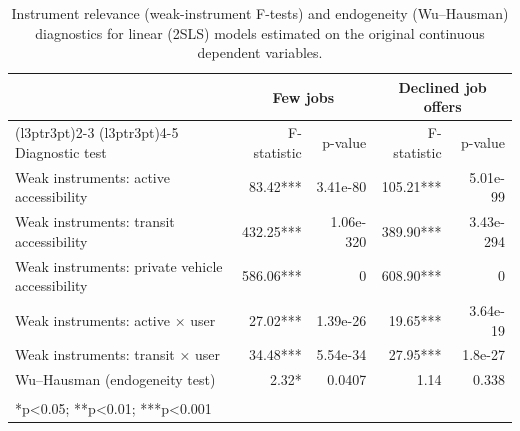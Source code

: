 \documentclass[preprint, 3p,
authoryear]{elsarticle} %
\begin{document}
\begin{table}[H]
\centering
\caption{\label{tab:unnamed-chunk-5}\label{tab:iv-diagnostics}Instrument relevance (weak-instrument F-tests) and endogeneity (Wu--Hausman) diagnostics for linear (2SLS) models estimated on the original continuous dependent variables.}
\centering
\begin{tabular}[t]{lrrrr}
\toprule
\multicolumn{1}{c}{ } & \multicolumn{2}{c}{Few jobs} & \multicolumn{2}{c}{Declined job offers} \\
\cmidrule(l{3pt}r{3pt}){2-3} \cmidrule(l{3pt}r{3pt}){4-5}
Diagnostic test & F-statistic & p-value & F-statistic & p-value\\
\midrule
Weak instruments: active accessibility & 83.42*** & 3.41e-80 & 105.21*** & 5.01e-99\\
Weak instruments: transit accessibility & 432.25*** & 1.06e-320 & 389.90*** & 3.43e-294\\
Weak instruments: private vehicle accessibility & 586.06*** & 0 & 608.90*** & 0\\
Weak instruments: active × user & 27.02*** & 1.39e-26 & 19.65*** & 3.64e-19\\
Weak instruments: transit × user & 34.48*** & 5.54e-34 & 27.95*** & 1.8e-27\\
\addlinespace
Wu–Hausman (endogeneity test) & 2.32* & 0.0407 & 1.14 & 0.338\\
\bottomrule
\multicolumn{5}{l}{\textsuperscript{} *p<0.05; **p<0.01; ***p<0.001}\\
\end{tabular}
\end{table}

\renewcommand{\thetable}{A.3}
\end{document}
